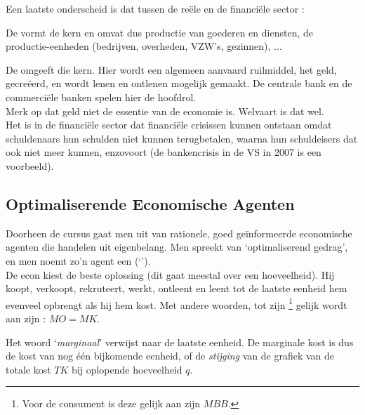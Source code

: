 \par\noindent Een laatste onderscheid is dat tussen de re\"ele en de financi\"ele sector :

\begin{leftbar}
\par De  vormt de kern en omvat dus productie van goederen en diensten, de productie-eenheden (bedrijven, overheden, VZW's, gezinnen), ... \\
\par De  omgeeft die kern. Hier wordt een algemeen aanvaard ruilmiddel, het geld, gecre\"eerd, en wordt lenen en ontlenen mogelijk gemaakt. De centrale bank en de commerci\"ele banken spelen hier de hoofdrol.\\
Merk op dat geld niet de essentie van de economie is. Welvaart is dat wel.\\
Het is in de financi\"ele sector dat financi\"ele crisissen kunnen ontstaan omdat schuldenaars hun schulden niet kunnen terugbetalen, waarna hun schuldeisers dat ook niet meer kunnen, enzovoort (de bankencrisis in de VS in 2007 is een voorbeeld).
\end{leftbar}

\subsection{Optimaliserende Economische Agenten}\label{sec:h0oea}

Doorheen de cursus gaat men uit van rationele, goed ge\"informeerde economische agenten die handelen uit eigenbelang. Men spreekt van `optimaliserend gedrag', en men noemt zo'n agent een  (`').\\
De econ kiest de beste oplossing (dit gaat meestal over een hoeveelheid). Hij koopt, verkoopt, rekruteert, werkt, ontleent en leent tot de laatste eenheid hem evenveel opbrengt als hij hem kost. Met andere woorden, tot zijn \footnote{Voor de consument is deze gelijk aan zijn  $MBB$.} gelijk wordt aan zijn  : $MO=MK$. \\

\par\noindent Het woord `\textit{marginaal}' verwijst naar de laatste eenheid. De marginale kost is dus de kost van nog \'e\'en bijkomende eenheid, of de \textit{stijging} van de grafiek van de totale kost $TK$ bij oplopende hoeveelheid $q$. \\

